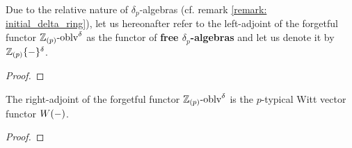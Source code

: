             \begin{corollary} \label{coro: quotients_and_localisations_of_delta_rings}
                
            \end{corollary}    
            \begin{convention} \label{conv: free_delta_rings}
                Due to the relative nature of $\delta_p$-algebras (cf. remark \ref{remark: initial_delta_ring}), let us hereonafter refer to the left-adjoint of the forgetful functor $\mathbb{Z}_{(p)}\text{-}\mathrm{oblv}^{\delta}$ as the functor of \textbf{free $\delta_p$-algebras} and let us denote it by $\mathbb{Z}_{(p)}\{-\}^{\delta}$.
            \end{convention}
            \begin{proposition} \label{prop: delta_polynomials}
                
            \end{proposition}
                \begin{proof}
                    
                \end{proof}
            \begin{proposition} \label{prop: witt_vector_rings_are_cofree_delta_rings}
                The right-adjoint of the forgetful functor $\mathbb{Z}_{(p)}\text{-}\mathrm{oblv}^{\delta}$ is the $p$-typical Witt vector functor $W(-)$.
            \end{proposition}
                \begin{proof}
                    
                \end{proof}
            
